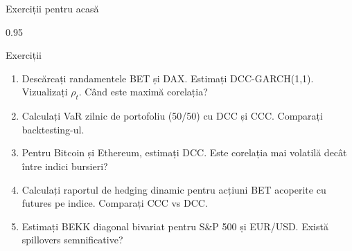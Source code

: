 \documentclass[9pt, aspectratio=169, t]{beamer}
\begin{document}
\begin{frame}{Exerciții pentru acasă}
    \begin{cminipage}{0.95\textwidth}
    {\footnotesize
    \vspace{-2mm}
    \begin{block}{Exerciții}
        \begin{enumerate}\setlength{\itemsep}{1pt}
            \item Descărcați randamentele BET și DAX. Estimați DCC-GARCH(1,1). Vizualizați $\rho_t$. Când este maximă corelația?
            \item Calculați VaR zilnic de portofoliu (50/50) cu DCC și CCC. Comparați backtesting-ul.
            \item Pentru Bitcoin și Ethereum, estimați DCC. Este corelația mai volatilă decât între indici bursieri?
            \item Calculați raportul de hedging dinamic pentru acțiuni BET acoperite cu futures pe indice. Comparați CCC vs DCC.
            \item Estimați BEKK diagonal bivariat pentru S\&P 500 și EUR/USD. Există spillovers semnificative?
        \end{enumerate}
    \end{block}
    }
    \end{cminipage}
\end{frame}
\end{document}
